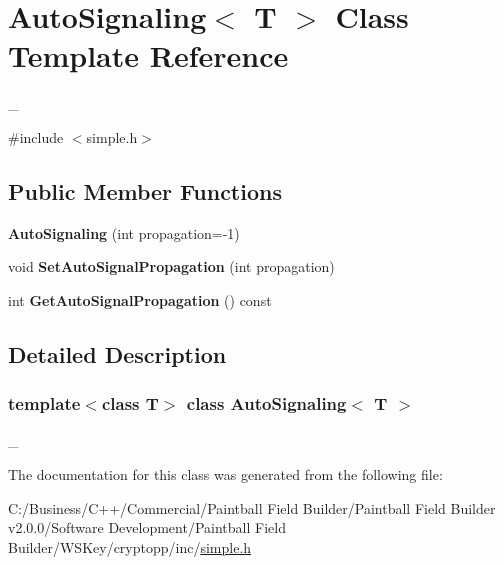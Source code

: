 \hypertarget{class_auto_signaling}{
\section{AutoSignaling$<$ T $>$ Class Template Reference}
\label{class_auto_signaling}
}


\_\-  


{\ttfamily \#include $<$simple.h$>$}\subsection*{Public Member Functions}
\begin{DoxyCompactItemize}
\item 
\hypertarget{class_auto_signaling_aa4972f0ce40ede0292d7d74532570d3c}{
{\bfseries AutoSignaling} (int propagation=-\/1)}
\label{class_auto_signaling_aa4972f0ce40ede0292d7d74532570d3c}

\item 
\hypertarget{class_auto_signaling_ae63c0428295aeec8ffd9557ef1d86db9}{
void {\bfseries SetAutoSignalPropagation} (int propagation)}
\label{class_auto_signaling_ae63c0428295aeec8ffd9557ef1d86db9}

\item 
\hypertarget{class_auto_signaling_a8dda9fc737e8b23c62f5534df7cb35f2}{
int {\bfseries GetAutoSignalPropagation} () const }
\label{class_auto_signaling_a8dda9fc737e8b23c62f5534df7cb35f2}

\end{DoxyCompactItemize}


\subsection{Detailed Description}
\subsubsection*{template$<$class T$>$ class AutoSignaling$<$ T $>$}

\_\- 

The documentation for this class was generated from the following file:\begin{DoxyCompactItemize}
\item 
C:/Business/C++/Commercial/Paintball Field Builder/Paintball Field Builder v2.0.0/Software Development/Paintball Field Builder/WSKey/cryptopp/inc/\hyperlink{simple_8h}{simple.h}\end{DoxyCompactItemize}
